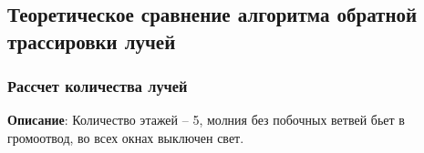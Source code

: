 
	


\subsection{Теоретическое сравнение алгоритма обратной трассировки лучей}

\subsubsection{Рассчет количества лучей}

\textbf{Описание}: Количество этажей -- 5, молния без побочных ветвей бьет в громоотвод, во всех окнах выключен свет.

